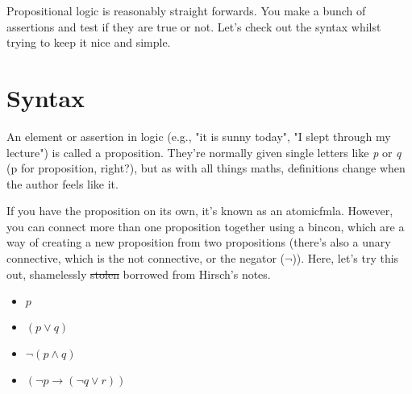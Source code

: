 Propositional logic is reasonably straight forwards. You make a bunch of assertions and test if they are true or not. Let's check out the syntax whilst trying to keep it nice and simple.

\section{Syntax}
An element or assertion in logic (e.g., "it is sunny today", "I slept through my lecture") is called a \gls{proposition}. They're normally given single letters like \textit{p} or \textit{q} (p for proposition, right?), but as with all things maths, definitions change when the author feels like it.

If you have the proposition on its own, it's known as an \gls{atomicfmla}. However, you can connect more than one proposition together using a \gls{bincon}, which are a way of creating a new proposition from two propositions (there's also a unary connective, which is the not connective, or the negator ($\neg$)). Here, let's try this out, shamelessly \sout{stolen} borrowed from Hirsch's notes.

\begin{itemize}
    \item $p$
    \item $(p \lor q)$
    \item $\neg(p \land q)$
    \item $(\neg p \to (\neg q \lor r))$
\end{itemize}
